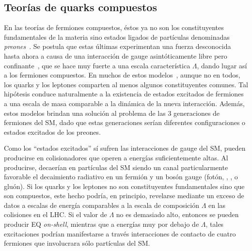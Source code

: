 \subsection{Teorías de quarks compuestos}
\label{subsec:theory:bsm:qstar}

En las teorías de fermiones compuestos, éstos ya no son los constituyentes fundamentales de la materia sino estados ligados de partículas denominadas \textit{preones}~\cite{Pfeil-1981}. Se postula que estas últimas experimentan una fuerza desconocida hasta ahora a causa de una interacción de gauge asintóticamente libre pero confinante~\cite{Hooft-1980}, que se hace muy fuerte a una escala característica \(\Lambda\), dando lugar así a los fermiones compuestos. En muchos de estos modelos~\cite{Pati_Salam_Strathdee-1975,Fritzsch_Mandelbaum-1981,Baur_Fritzsch-1984}, aunque no en todos, los quarks y los leptones comparten al menos algunos constituyentes comunes. Tal hipótesis conduce naturalmente a la existencia de estados excitados de fermiones a una escala de masa comparable a la dinámica de la nueva interacción. Además, estos modelos brindan una solución al problema de las 3 generaciones de fermiones del \ac{SM}, dado que estas generaciones serían diferentes configuraciones o estados excitados de los preones.

Como los \enquote{estados excitados} sí sufren las interacciones de gauge del \ac{SM}, pueden producirse en colisionadores que operen a energías suficientemente altas. Al producirse, decaerían en partículas del \ac{SM} siendo un canal particularmente favorable el decaimiento radiativo en un fermión y un bosón gauge (fotón, \Wboson, \Zboson, o gluón). Si los quarks y los leptones no son constituyentes fundamentales sino que son compuestos, este hecho podría, en principio, revelarse mediante un exceso de datos a escalas de energía comparables a la escala de composición \(\Lambda\) en las colisiones \pp en el \ac{LHC}. Si el valor de \(\Lambda\) no es demasiado alto, entonces se pueden producir \ac{EQ} \textit{on-shell}, mientras que a energías muy por debajo de \(\Lambda\), tales excitaciones podrían manifestarse a través interacciones de contacto de cuatro fermiones que involucrara sólo partículas del \ac{SM}.


